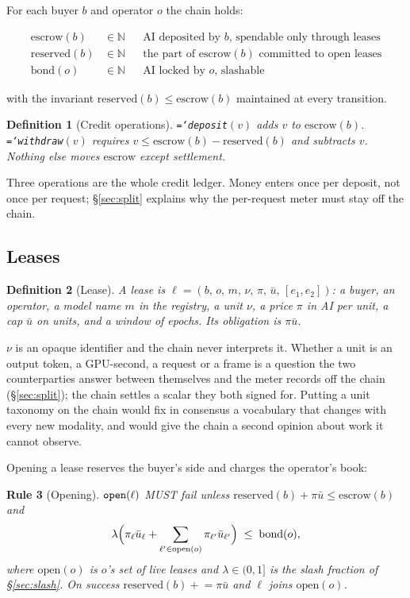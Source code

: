 \documentclass[11pt,a4paper]{article}
\newtheorem{definition}{Definition}[section]
\newtheorem{norm}[definition]{Rule}
\newcommand{\code}[1]{\texttt{\hyphenchar\font=`\-\relax #1}}
\newcommand{\bond}{\mathrm{bond}}
\newcommand{\esc}{\mathrm{escrow}}
\newcommand{\res}{\mathrm{reserved}}
\newcommand{\open}{\mathrm{open}}
\begin{document}
For each buyer $b$ and operator $o$ the chain holds:

\begin{align*}
  \esc(b)  &\in \mathbb{N} && \text{AI deposited by $b$, spendable only through leases} \\
  \res(b)  &\in \mathbb{N} && \text{the part of $\esc(b)$ committed to open leases} \\
  \bond(o) &\in \mathbb{N} && \text{AI locked by $o$, slashable}
\end{align*}

with the invariant $\res(b) \le \esc(b)$ maintained at every transition.

\begin{definition}[Credit operations]
\code{deposit}$(v)$ adds $v$ to $\esc(b)$.
\code{withdraw}$(v)$ requires $v \le \esc(b) - \res(b)$ and subtracts $v$.
Nothing else moves $\esc$ except settlement.
\end{definition}

Three operations are the whole credit ledger. Money enters once per deposit, not
once per request; §\ref{sec:split} explains why the per-request meter must stay
off the chain.

\subsection{Leases}

\begin{definition}[Lease]
A \emph{lease} is
$\ell = (b,\, o,\, m,\, \nu,\, \pi,\, \bar u,\, [e_1, e_2])$: a buyer, an
operator, a model name $m$ in the registry, a \emph{unit} $\nu$, a price $\pi$ in
AI per unit, a cap $\bar u$ on units, and a window of epochs. Its
\emph{obligation} is $\pi \bar u$.
\end{definition}

$\nu$ is an opaque identifier and the chain never interprets it. Whether a unit
is an output token, a GPU-second, a request or a frame is a question the two
counterparties answer between themselves and the meter records off the chain
(§\ref{sec:split}); the chain settles a scalar they both signed for. Putting a
unit taxonomy on the chain would fix in consensus a vocabulary that changes with
every new modality, and would give the chain a second opinion about work it
cannot observe.

Opening a lease reserves the buyer's side and charges the operator's book:

\begin{norm}[Opening]
\label{rule:open}
$\code{open}(\ell)$ MUST fail unless
$\res(b) + \pi \bar u \le \esc(b)$ and
\[
  \lambda \Bigl(\pi_\ell \bar u_\ell +
    \sum_{\ell' \in \open(o)} \pi_{\ell'} \bar u_{\ell'}\Bigr) \;\le\; \bond(o),
\]
where $\open(o)$ is $o$'s set of live leases and $\lambda \in (0,1]$ is the
slash fraction of §\ref{sec:slash}. On success $\res(b) \mathrel{+}= \pi\bar u$
and $\ell$ joins $\open(o)$.
\end{norm}
\end{document}
